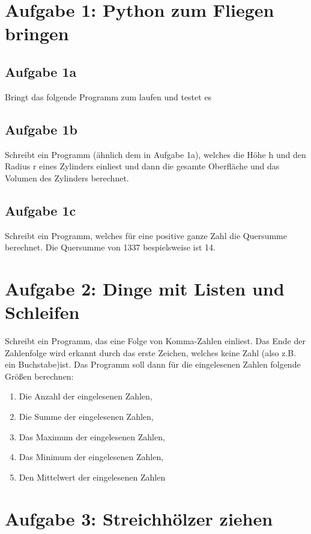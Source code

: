 \documentclass{article}%
\begin{document}
 

\section{Aufgabe 1: Python zum Fliegen bringen}

\subsection{Aufgabe 1a}
Bringt das folgende Programm zum laufen und testet es

\subsection{Aufgabe 1b}
Schreibt ein Programm (ähnlich dem in Aufgabe 1a), welches die Höhe h und den Radius r
eines Zylinders einliest und dann die gesamte Oberfläche und das Volumen des Zylinders berechnet.

\subsection{Aufgabe 1c}
Schreibt ein Programm, welches für eine positive ganze Zahl die Quersumme
berechnet. Die Quersumme von 1337 bespielsweise ist 14.

\newpage
\section{Aufgabe 2: Dinge mit Listen und Schleifen}
Schreibt ein Programm, das eine Folge von Komma-Zahlen einliest. Das Ende
der Zahlenfolge wird erkannt durch das erste Zeichen, welches keine Zahl (also z.B. ein Buchstabe)ist.
Das Programm soll dann für die eingelesenen Zahlen folgende Größen berechnen:
\begin{enumerate}
\item Die Anzahl der eingelesenen Zahlen,
\item Die Summe der eingelesenen Zahlen,
\item Das Maximum der eingelesenen Zahlen,
\item Das Minimum der eingelesenen Zahlen,
\item Den Mittelwert der eingelesenen Zahlen
\end{enumerate}

\newpage
\section{Aufgabe 3: Streichhölzer ziehen}
\end{document}
